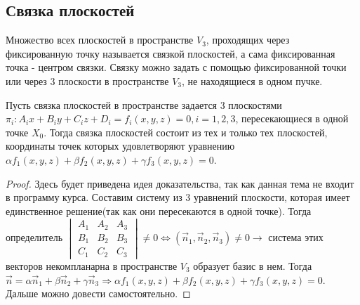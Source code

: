 \subsection{Связка плоскостей}
\begin{definition}
	Множество всех плоскостей в пространстве \(V_3\), проходящих через фиксированную точку называется связкой плоскостей, а сама фиксированная точка - центром связки.\newline
	Связку можно задать с помощью фиксированной точки или через 3 плоскости в пространстве \(V_3\), не находящиеся в одном пучке.
\end{definition}
\begin{theorem}
	Пусть связка плоскостей в пространстве задается 3 плоскостями \(\pi_i: A_ix+B_iy+C_iz+D_i = f_i(x,y,z) = 0, i = 1,2,3\), пересекающиеся в одной точке \(X_0\). Тогда связка плоскостей состоит из тех и только тех плоскостей, координаты точек которых удовлетворяют уравнению \(\alpha f_1(x,y,z) + \beta f_2(x,y,z)+\gamma f_3(x,y,z) = 0\).
\end{theorem}
\begin{proof}
	Здесь будет приведена идея доказательства, так как данная тема не входит в программу курса. Составим систему из 3 уравнений плоскости, которая имеет единственное решение(так как они пересекаются в одной точке). Тогда определитель \(\begin{vmatrix}
		A_1 & A_2 & A_3 \\ B_1 & B_2 & B_3 \\ C_1 & C_2 & C_3
	\end{vmatrix} \ne 0 \Longleftrightarrow (\vec n_1, \vec n_2, \vec n_3) \ne 0\longrightarrow\) система этих векторов некомпланарна в пространстве \(V_3\) образует базис в нем. Тогда \(\vec n = \alpha \vec n_1 + \beta \vec n_2 + \gamma \vec n_3\Longrightarrow \alpha f_1(x,y,z) + \beta f_2(x,y,z) + \gamma f_3(x,y,z) = 0\). Дальше можно довести самостоятельно.
\end{proof}
